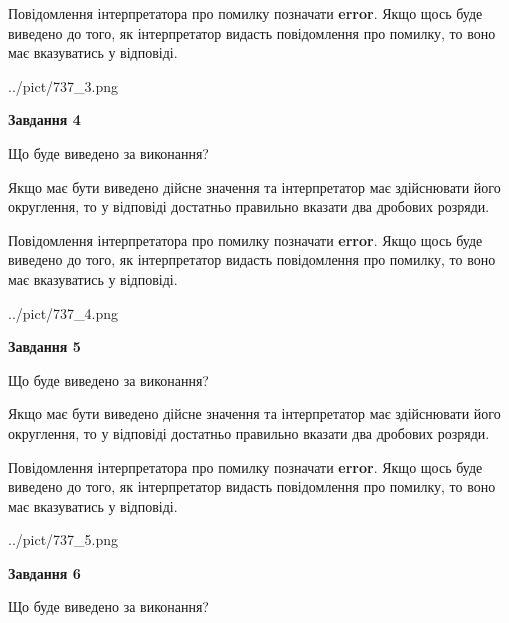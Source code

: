 \documentclass[12pt, ukrainian]{article}
\begin{document}
{\begin {Large}
Повідомлення інтерпретатора про помилку позначати \textbf{error}.
Якщо щось буде виведено до того, як інтерпретатор видасть повідомлення про помилку, 
то воно має вказуватись у відповіді. \par

\begin{center}
	{../pict/737_3.png}
\end{center}
\newpage

{\begin {center}\textbf{Завдання 4}\end {center}}\par
Що буде виведено за виконання? \par

Якщо має бути виведено дійсне значення та інтерпретатор має здійснювати його округлення, 
то у відповіді достатньо правильно вказати два дробових розряди.

Повідомлення інтерпретатора про помилку позначати \textbf{error}.
Якщо щось буде виведено до того, як інтерпретатор видасть повідомлення про помилку, 
то воно має вказуватись у відповіді. \par

\begin{center}
	{../pict/737_4.png}
\end{center}
\newpage

{\begin {center}\textbf{Завдання 5}\end {center}}\par
Що буде виведено за виконання? \par

Якщо має бути виведено дійсне значення та інтерпретатор має здійснювати його округлення, 
то у відповіді достатньо правильно вказати два дробових розряди.

Повідомлення інтерпретатора про помилку позначати \textbf{error}.
Якщо щось буде виведено до того, як інтерпретатор видасть повідомлення про помилку, 
то воно має вказуватись у відповіді. \par

\begin{center}
	{../pict/737_5.png}
\end{center}
\newpage

{\begin {center}\textbf{Завдання 6}\end {center}}\par
Що буде виведено за виконання? \par


\end{Large}}
\end{document}
